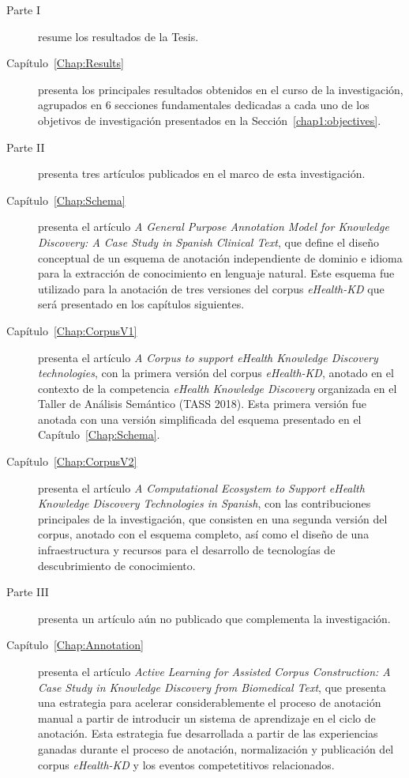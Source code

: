 \begin{description}
\item[Parte I] resume los resultados de la Tesis.

\item [Capítulo~\ref{Chap:Results}] presenta los principales resultados obtenidos en el curso de la investigación, agrupados en 6 secciones fundamentales dedicadas a cada uno de los objetivos de investigación presentados en la Sección~\ref{chap1:objectives}.

\item[Parte II] presenta tres artículos publicados en el marco de esta investigación.

\item [Capítulo~\ref{Chap:Schema}] presenta el artículo \textit{A General Purpose Annotation Model for Knowledge Discovery: A Case Study in Spanish Clinical Text}, que define el diseño conceptual de un esquema de anotación independiente de dominio e idioma para la extracción de conocimiento en lenguaje natural. Este esquema fue utilizado para la anotación de tres versiones del corpus \textit{eHealth-KD} que será presentado en los capítulos siguientes.

\item [Capítulo~\ref{Chap:CorpusV1}] presenta el artículo \textit{A Corpus to support eHealth Knowledge Discovery technologies}, con la primera versión del corpus \textit{eHealth-KD}, anotado en el contexto de la competencia \textit{eHealth Knowledge Discovery} organizada en el Taller de Análisis Semántico (TASS 2018). Esta primera versión fue anotada con una versión simplificada del esquema presentado en el Capítulo~\ref{Chap:Schema}.

\item [Capítulo~\ref{Chap:CorpusV2}] presenta el artículo \textit{A Computational Ecosystem to Support eHealth Knowledge Discovery Technologies in Spanish}, con las contribuciones principales de la investigación, que consisten en una segunda versión del corpus, anotado con el esquema completo, así como el diseño de una infraestructura y recursos para el desarrollo de tecnologías de descubrimiento de conocimiento.

\item[Parte III] presenta un artículo aún no publicado que complementa la investigación.

\item [Capítulo~\ref{Chap:Annotation}] presenta el artículo \textit{Active Learning for Assisted Corpus Construction: A Case Study in Knowledge Discovery from Biomedical Text}, que presenta una estrategia para acelerar considerablemente el proceso de anotación manual a partir de introducir un sistema de aprendizaje en el ciclo de anotación. Esta estrategia fue desarrollada a partir de las experiencias ganadas durante el proceso de anotación, normalización y publicación del corpus \textit{eHealth-KD} y los eventos competetitivos relacionados.


\end{description}
